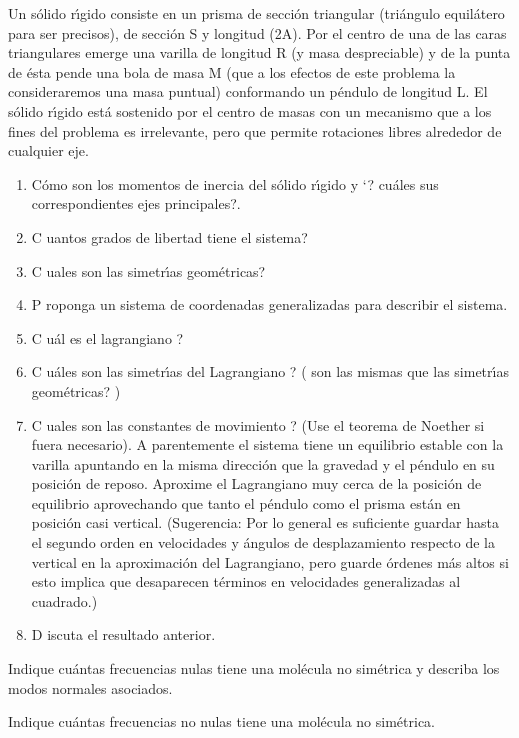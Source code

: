 \documentclass[10pt,oneside]{CBFT_book}
\begin{document}
\begin{ejercicios}
\label{ej14}
\item{ \bf }
Un sólido rı́gido consiste en un prisma de sección triangular (triángulo equilátero para
ser precisos), de sección S y longitud (2A). Por el centro de una de las caras triangulares
emerge una varilla de longitud R (y masa despreciable) y de la punta de ésta pende
una bola de masa M (que a los efectos de este problema la consideraremos una masa
puntual) conformando un péndulo de longitud L.
El sólido rı́gido está sostenido por el centro de masas con un mecanismo que a los fines
del problema es irrelevante, pero que permite rotaciones libres alrededor de cualquier eje.
\begin{enumerate}[label=(\alph*)]
\item Cómo son los momentos de inercia del sólido rı́gido y ‘? cuáles sus correspondientes
ejes principales?.
\item C uantos grados de libertad tiene el sistema?
\item C uales son las simetrı́as geométricas?
\item P roponga un sistema de coordenadas generalizadas para describir el sistema.
\item C uál es el lagrangiano ?
\item C uáles son las simetrı́as del Lagrangiano ? ( son las mismas que las simetrı́as
geométricas? )
\item C uales son las constantes de movimiento ? (Use el teorema de Noether si fuera
necesario).
A parentemente el sistema tiene un equilibrio estable con la varilla apuntando en
la misma dirección que la gravedad y el péndulo en su posición de reposo.
Aproxime el Lagrangiano muy cerca de la posición de equilibrio aprovechando que
tanto el péndulo como el prisma están en posición casi vertical. (Sugerencia: Por lo general
es suficiente guardar hasta el segundo orden en velocidades y ángulos de desplazamiento
respecto de la vertical en la aproximación del Lagrangiano, pero guarde órdenes más altos si
esto implica que desaparecen términos en velocidades generalizadas al cuadrado.)
\item D iscuta el resultado anterior.
\end{enumerate}



\label{ej15}
\item{ \bf }
Indique cuántas frecuencias nulas tiene una molécula no simétrica y describa los modos
normales asociados.

\label{ej16}
\item{ \bf }
Indique cuántas frecuencias no nulas tiene una molécula no simétrica.



\end{ejercicios}


\end{document}
